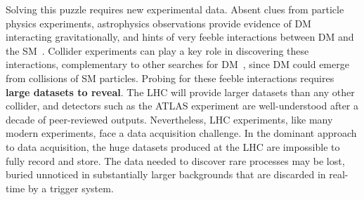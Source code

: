 Solving this puzzle requires new experimental data. 
Absent clues from particle physics experiments, 
astrophysics observations provide evidence of DM interacting gravitationally, and hints of very feeble interactions between DM and the SM~\cite{Bernal:2017kxu,Steigman:2012nb}. 
Collider experiments can play a key role in discovering these interactions, complementary to other searches for DM~\cite{Boveia:2018yeb}, since DM could emerge from collisions of SM particles.
Probing for these feeble interactions requires \textbf{large datasets to reveal}.
The LHC will provide larger datasets than any other collider, and detectors such as the ATLAS experiment are well-understood after a decade of peer-reviewed outputs.
Nevertheless, LHC experiments, like many modern experiments, face a data acquisition challenge.
In the dominant approach to data acquisition, the huge datasets produced at the LHC are impossible to fully record and store.
The data needed to discover rare processes may be lost, buried unnoticed in substantially larger backgrounds that are discarded in real-time by a trigger system.

